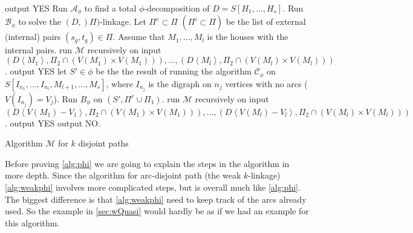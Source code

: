 \begin{algorithm}
    \begin{algorithmic}[1]
        \IF{$\Pi=\emptyset$}
            \STATE output YES
        \ENDIF
        \STATE Run $\mathcal{A}_{\phi}$ to find a total $\phi$-decomposition of $D=S[H_1,\dots,H_s]$.
            \STATE Run $\mathcal{B}_{\phi}$ to solve the $(D,)\Pi)$-linkage.
        \ENDIF
        \STATE Let $\Pi^e\subset \Pi$ $(\Pi^i\subset \Pi)$ be the list of external (internal) pairs $(s_q,t_q)\in \Pi$.
        \STATE Assume that $M_1,\dots , M_l$ is the houses with the internal pairs.
             \label{state 3a}
                \STATE run $\mathcal{M}$ recursively on input $(D\left<M_1\right>, \Pi_2\cap (V(M_1)\times V(M_1))) , \dots ,(D\left<M_l\right>, \Pi_2\cap (V(M_l)\times V(M_l)))$.
                    \STATE output YES
                \ENDIF
            \ENDIF
             \label{state 3b}
                    \STATE let $S'\in \phi$ be the the result of running the algorithm $\mathcal{C}_\phi$ on $S[I_{n_1},\dots,I_{n_l},M_{l+1},\dots , M_s]$, where $I_{n_j}$ is the digraph on $n_j$ vertices with no arcs ($V(I_{n_j})=V_j$).            
                    \STATE Run $B_{\phi}$ on $(S',\Pi^e\cup\Pi_1)$.
                        \STATE run $\mathcal{M}$ recursively on input $(D\left<V(M_1)-V_1\right>, \Pi_2\cap (V(M_1)\times V(M_1))) , \dots ,(D\left<V(M_l)-V_l\right>, \Pi_2\cap (V(M_l)\times V(M_l)))$.
                    \ENDIF 
                        \STATE output YES
                    \ENDIF
                \ENDFOR
            \ENDIF
        \ENDFOR 
        \STATE output NO.
    \end{algorithmic}
    \caption{Algorithm $\mathcal{M}$ for $k$ disjoint paths}
    \label{alg:phi}
\end{algorithm}
Before proving \autoref{alg:phi} we are going to explain the steps in the algorithm in more depth.
Since the algorithm for arc-disjoint path (the weak $k$-linkage) \autoref{alg:weakphi} involves more complicated steps, but is overall much like \autoref{alg:phi}. 
The biggest difference is that \autoref{alg:weakphi} need to keep track of the arcs already used. 
So the example in \autoref{sec:wQuasi} would hardly be as if we had an example for this algorithm.

